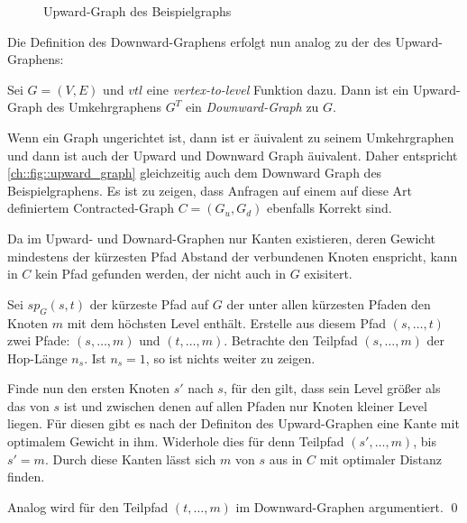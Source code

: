 \begin{figure}[ht]
  \caption{Upward-Graph des Beispielgraphs}
  \label{ch::fig::upward_graph}
\end{figure}

Die Definition des Downward-Graphens erfolgt nun analog zu der des Upward-Graphens:

\begin{definition}
  Sei $G = (V, E)$ und ${vtl}$ eine \emph{vertex-to-level} Funktion dazu. Dann ist ein Upward-Graph des Umkehrgraphens $G^T$ ein \emph{Downward-Graph} zu $G$.
\end{definition}

Wenn ein Graph ungerichtet ist, dann ist er äuivalent zu seinem Umkehrgraphen und dann ist auch der Upward und Downward Graph äuivalent.
Daher entspricht \autoref{ch::fig::upward_graph} gleichzeitig auch dem Downward Graph des Beispielgraphens.
Es ist zu zeigen, dass Anfragen auf einem auf diese Art definiertem Contracted-Graph $C = (G_u, G_d)$ ebenfalls Korrekt sind.

\begin{beweis}
  Da im Upward- und Downard-Graphen nur Kanten existieren, deren Gewicht mindestens der kürzesten Pfad Abstand der verbundenen Knoten enspricht, kann in $C$ kein Pfad gefunden werden, der nicht auch in $G$ exisitert.

  Sei ${sp}_G(s, t)$ der kürzeste Pfad auf $G$ der unter allen kürzesten Pfaden den Knoten $m$ mit dem höchsten Level enthält.
  Erstelle aus diesem Pfad $(s, \dotsc, t)$ zwei Pfade: $(s, \dotsc, m)$ und $(t, \dotsc, m)$.
  Betrachte den Teilpfad $(s, \dotsc, m)$ der Hop-Länge $n_s$.
  Ist $n_s = 1$, so ist nichts weiter zu zeigen.

  Finde nun den ersten Knoten $s'$ nach $s$, für den gilt, dass sein Level größer als das von $s$ ist und zwischen denen auf allen Pfaden nur Knoten kleiner Level liegen.
  Für diesen gibt es nach der Definiton des Upward-Graphen eine Kante mit optimalem Gewicht in ihm.
  Widerhole dies für denn Teilpfad $(s', \dotsc, m)$, bis $s' = m$.
  Durch diese Kanten lässt sich $m$ von $s$ aus in $C$ mit optimaler Distanz finden.

  Analog wird für den Teilpfad $(t, \dotsc, m)$ im Downward-Graphen argumentiert.
  \qed
\end{beweis}


